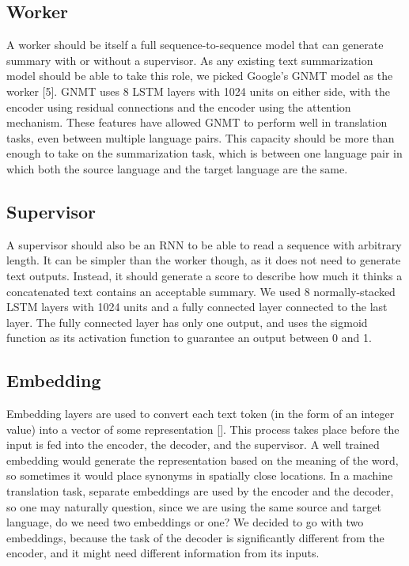 \documentclass[letterpaper]{article} %
\begin{document}
\subsection{Worker}
A worker should be itself a full sequence-to-sequence model that can generate summary with or without a supervisor. As any existing text summarization model should be able to take this role, we picked Google’s GNMT model as the worker [5]. GNMT uses 8 LSTM layers with 1024 units on either side, with the encoder using residual connections and the encoder using the attention mechanism. These features have allowed GNMT to perform well in translation tasks, even between multiple language pairs. This capacity should be more than enough to take on the summarization task, which is between one language pair in which both the source language and the target language are the same.

\subsection{Supervisor}
A supervisor should also be an RNN to be able to read a sequence with arbitrary length. It can be simpler than the worker though, as it does not need to generate text outputs. Instead, it should generate a score to describe how much it thinks a concatenated text contains an acceptable summary. We used 8 normally-stacked LSTM layers with 1024 units and a fully connected layer connected to the last layer. The fully connected layer has only one output, and uses the sigmoid function as its activation function to guarantee an output between 0 and 1.

\subsection{Embedding}
Embedding layers are used to convert each text token (in the form of an integer value) into a vector of some representation []. This process takes place before the input is fed into the encoder, the decoder, and the supervisor. A well trained embedding would generate the representation based on the meaning of the word, so sometimes it would place synonyms in spatially close locations. In a machine translation task, separate embeddings are used by the encoder and the decoder, so one may naturally question, since we are using the same source and target language, do we need two embeddings or one? We decided to go with two embeddings, because the task of the decoder is significantly different from the encoder, and it might need different information from its inputs.
\end{document}
